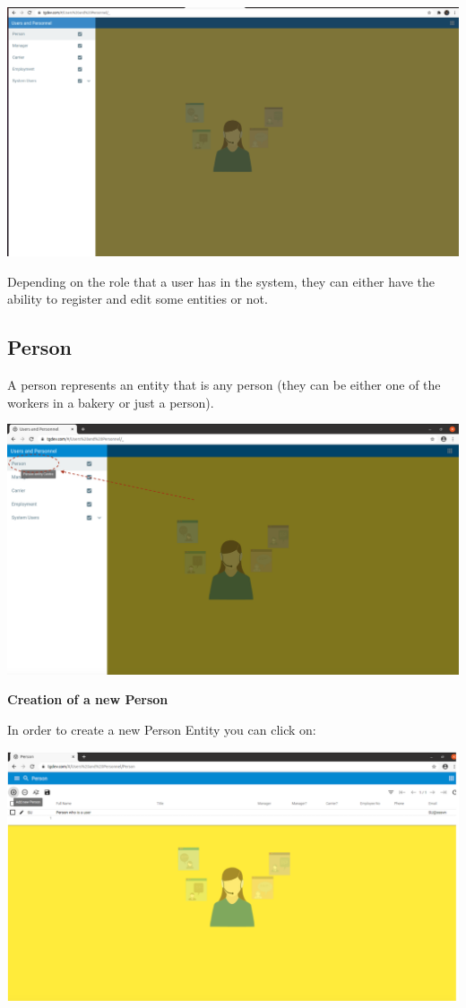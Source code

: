 \includegraphics[width=\textwidth]{sections/01-chapter/images/personnel.png}



Depending on the role that a user has in the system, they can either have the ability to register and edit some entities or not. 

\subsection{Person}
A person represents an entity that is any person (they can be either one of the workers in a bakery or just a person).

\includegraphics[width=\textwidth]{sections/01-chapter/images/person11.png}

\textbf{Creation of a new Person}

In order to create a new Person Entity you can click on: 

\includegraphics[width=\textwidth]{sections/01-chapter/images/person2.png}

